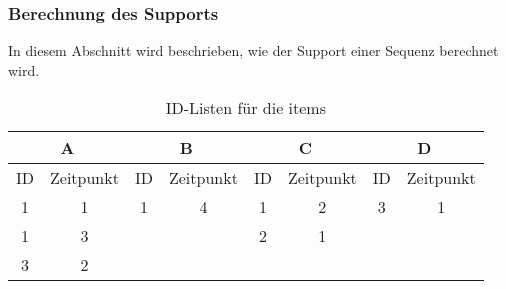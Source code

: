 \subsubsection{Berechnung des Supports}
In diesem Abschnitt wird beschrieben, wie der Support einer Sequenz berechnet wird.
\begin{table}[hbt]\label{idlist}
\centering
\begin{tabular}{c|c|c|c|c|c|c|c}
\multicolumn{2}{c|}{A} & \multicolumn{2}{c|}{B} & \multicolumn{2}{c|}{C} & \multicolumn{2}{c}{D} \\ \hline
ID & Zeitpunkt & ID & Zeitpunkt & ID & Zeitpunkt & ID & Zeitpunkt \\
1	 & 1				 & 1  & 4				  & 1  & 2				 & 3  & 1 \\
1  & 3				 &    &				    & 2  & 1				 &    & \\
3  & 2				 &    &				    &    &  				 &    & \\
\end{tabular}
\caption{ID-Listen für die items}
\end{table}